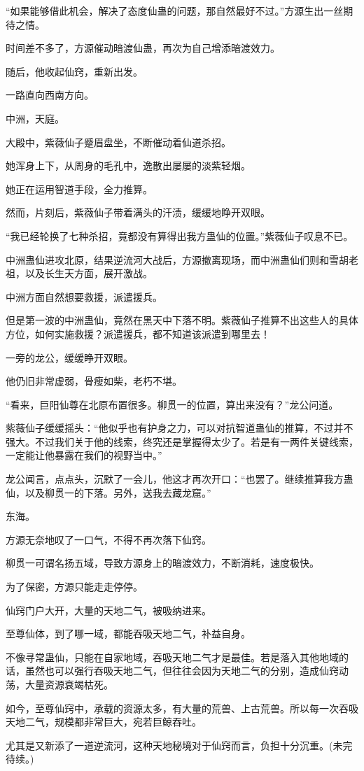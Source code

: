 \begin{this_body}
“如果能够借此机会，解决了态度仙蛊的问题，那自然最好不过。”方源生出一丝期待之情。

时间差不多了，方源催动暗渡仙蛊，再次为自己增添暗渡效力。

随后，他收起仙窍，重新出发。

一路直向西南方向。

中洲，天庭。

大殿中，紫薇仙子蹙眉盘坐，不断催动着仙道杀招。

她浑身上下，从周身的毛孔中，逸散出屡屡的淡紫轻烟。

她正在运用智道手段，全力推算。

然而，片刻后，紫薇仙子带着满头的汗渍，缓缓地睁开双眼。

“我已经轮换了七种杀招，竟都没有算得出我方蛊仙的位置。”紫薇仙子叹息不已。

中洲蛊仙进攻北原，结果逆流河大战后，方源撤离现场，而中洲蛊仙们则和雪胡老祖，以及长生天方面，展开激战。

中洲方面自然想要救援，派遣援兵。

但是第一波的中洲蛊仙，竟然在黑天中下落不明。紫薇仙子推算不出这些人的具体方位，如何实施救援？派遣援兵，都不知道该派遣到哪里去！

一旁的龙公，缓缓睁开双眼。

他仍旧非常虚弱，骨瘦如柴，老朽不堪。

“看来，巨阳仙尊在北原布置很多。柳贯一的位置，算出来没有？”龙公问道。

紫薇仙子缓缓摇头：“他似乎也有护身之力，可以对抗智道蛊仙的推算，不过并不强大。不过我们关于他的线索，终究还是掌握得太少了。若是有一两件关键线索，一定能让他暴露在我们的视野当中。”

龙公闻言，点点头，沉默了一会儿，他这才再次开口：“也罢了。继续推算我方蛊仙，以及柳贯一的下落。另外，送我去藏龙窟。”

东海。

方源无奈地叹了一口气，不得不再次落下仙窍。

柳贯一可谓名扬五域，导致方源身上的暗渡效力，不断消耗，速度极快。

为了保密，方源只能走走停停。

仙窍门户大开，大量的天地二气，被吸纳进来。

至尊仙体，到了哪一域，都能吞吸天地二气，补益自身。

不像寻常蛊仙，只能在自家地域，吞吸天地二气才是最佳。若是落入其他地域的话，虽然也可以强行吞吸天地二气，但往往会因为天地二气的分别，造成仙窍动荡，大量资源衰竭枯死。

如今，至尊仙窍中，承载的资源太多，有大量的荒兽、上古荒兽。所以每一次吞吸天地二气，规模都非常巨大，宛若巨鲸吞吐。

尤其是又新添了一道逆流河，这种天地秘境对于仙窍而言，负担十分沉重。(未完待续。)

\end{this_body}


